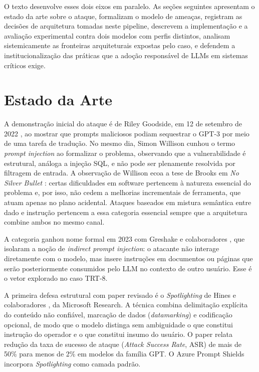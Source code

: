 \documentclass[11pt,a4paper]{article}
\begin{document}
O texto desenvolve esses dois eixos em paralelo. As seções seguintes apresentam o estado da arte sobre o ataque, formalizam o modelo de ameaças, registram as decisões de arquitetura tomadas neste pipeline, descrevem a implementação e a avaliação experimental contra dois modelos com perfis distintos, analisam sistemicamente as fronteiras arquiteturais expostas pelo caso, e defendem a institucionalização das práticas que a adoção responsável de LLMs em sistemas críticos exige.

\section{Estado da Arte}

A demonstração inicial do ataque é de Riley Goodside, em 12 de setembro de 2022 \cite{goodside2022}, ao mostrar que prompts maliciosos podiam sequestrar o GPT-3 por meio de uma tarefa de tradução. No mesmo dia, Simon Willison \cite{willison2022} cunhou o termo \emph{prompt injection} ao formalizar o problema, observando que a vulnerabilidade é estrutural, análoga a injeção SQL, e não pode ser plenamente resolvida por filtragem de entrada. A observação de Willison ecoa a tese de Brooks em \emph{No Silver Bullet} \cite{brooks1995}: certas dificuldades em software pertencem à natureza essencial do problema e, por isso, não cedem a melhorias incrementais de ferramenta, que atuam apenas no plano acidental. Ataques baseados em mistura semântica entre dado e instrução pertencem a essa categoria essencial sempre que a arquitetura combine ambos no mesmo canal.

A categoria ganhou nome formal em 2023 com Greshake e colaboradores \cite{greshake2023}, que isolaram a noção de \emph{indirect prompt injection}: o atacante não interage diretamente com o modelo, mas insere instruções em documentos ou páginas que serão posteriormente consumidos pelo LLM no contexto de outro usuário. Esse é o vetor explorado no caso TRT-8.

A primeira defesa estrutural com paper revisado é o \emph{Spotlighting} de Hines e colaboradores \cite{hines2024}, da Microsoft Research. A técnica combina delimitação explícita do conteúdo não confiável, marcação de dados (\emph{datamarking}) e codificação opcional, de modo que o modelo distinga sem ambiguidade o que constitui instrução do operador e o que constitui insumo do usuário. O paper relata redução da taxa de sucesso de ataque (\emph{Attack Success Rate}, ASR) de mais de 50\% para menos de 2\% em modelos da família GPT. O Azure Prompt Shields incorpora \emph{Spotlighting} como camada padrão.
\end{document}
